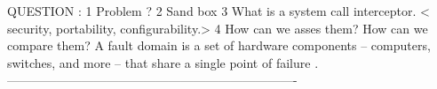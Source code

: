 QUESTION :  
1	Problem ?
2	Sand box 
3	What is a system call interceptor.
	< security, portability, configurability.>
4	How can we asses them? How can we compare them?
A fault domain is a set of hardware components – computers, switches, and more – that share a single point of failure
. 
 ----------------------------------------------------------------------
